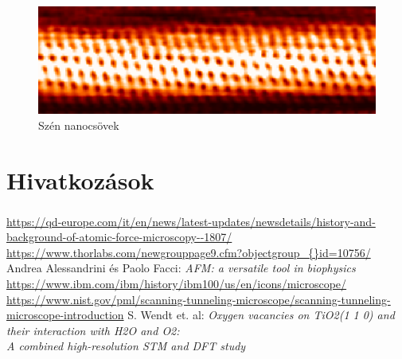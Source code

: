 \documentclass[aspectratio=169]{beamer}
\begin{document}
\begin{frame}
\begin{figure}
\includegraphics[width=.9\textwidth]{stm_end2.png}
\caption{Szén nanocsövek}
\end{figure}
\end{frame}

\section{Hivatkozások}
\begin{frame}
\frametitle{\secname}
\begin{thebibliography}{99}
\small
{}
\url{https://qd-europe.com/it/en/news/latest-updates/newsdetails/history-and-background-of-atomic-force-microscopy--1807/}
\url{https://www.thorlabs.com/newgrouppage9.cfm?objectgroup_{}id=10756/}
Andrea Alessandrini és Paolo Facci: \textit{AFM: a versatile tool in biophysics}
\url{https://www.ibm.com/ibm/history/ibm100/us/en/icons/microscope/}
\url{https://www.nist.gov/pml/scanning-tunneling-microscope/scanning-tunneling-microscope-introduction}
S. Wendt et. al: \textit{Oxygen vacancies on TiO2(1 1 0) and their interaction with H2O and O2:\\A combined high-resolution STM and DFT study}
\end{thebibliography}
\end{frame}
\end{document}
